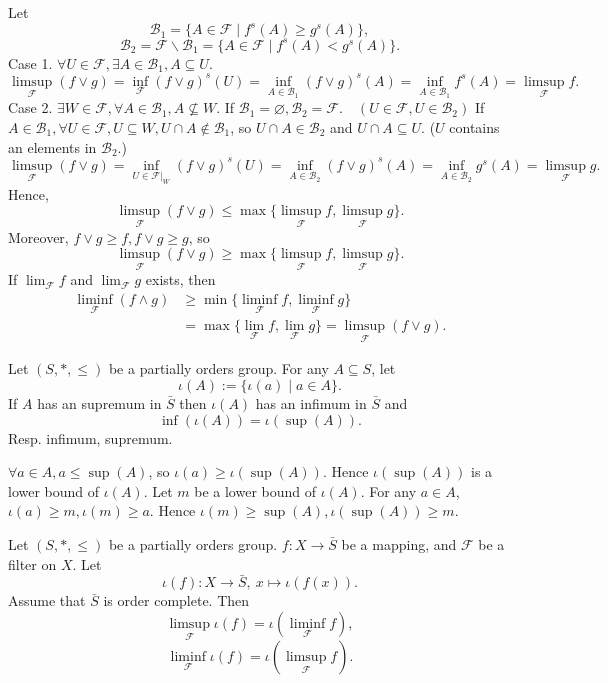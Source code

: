 \begin{proofenv}
    Let $$\mathcal{B}_1=\{A\in \mathcal{F}\mid f^s(A)\ge g^s(A)\},$$
    $$\mathcal{B}_2=\mathcal{F}\backslash\mathcal{B}_1=\{A\in\mathcal{F}\mid f^s(A)<g^s(A)\}.$$
    Case 1. $\forall U\in \mathcal{F},\exists A\in \mathcal{B}_1, A\subseteq U$.
    $$\limsup_\mathcal{F}(f\vee g)=\inf_{\mathcal{F}}(f\vee g)^s(U)=\inf_{A\in \mathcal{B}_1}(f\vee g)^s(A)=\inf _{A\in \mathcal{B}_1}f^s(A)=\limsup_{\mathcal{F}}f.$$
    Case 2. $\exists W\in \mathcal{F}, \forall A\in \mathcal{B}_1,A\nsubseteq  W$. If $\mathcal{B}_1=\varnothing, \mathcal{B}_2=\mathcal{F}.\quad (U\in \mathcal{F},U\in\mathcal{B}_2)$ If $A\in \mathcal{B}_1, \forall U\in \mathcal{F}, U\subseteq W, U\cap A\notin \mathcal{B}_1 $, so $U\cap A\in \mathcal{B}_2$ and $U\cap A\subseteq U$. ($U$ contains an elements in $\mathcal{B}_2$.)
    $$\limsup_{\mathcal{F}}(f\vee g)=\inf _{U\in \mathcal{F}|_W}(f\vee g)^s(U)=\inf_{A\in \mathcal{B}_2}(f\vee g)^s(A)=\inf_{A\in \mathcal{B}_2}g^s(A)=\limsup_{\mathcal{F}}g.$$
    Hence,
    $$\limsup_{\mathcal{F}}(f\vee g)\le \max\{\limsup_{\mathcal{F}}f,\limsup_{\mathcal{F}}g\}.$$
    Moreover, $f\vee g\ge f, f\vee g\ge g$, so
    $$\limsup_{\mathcal{F}}(f\vee g)\ge \max\{\limsup_{\mathcal{F}}f,\limsup_{\mathcal{F}}g\}.$$
    If $\lim_{\mathcal{F}}f$ and $\lim_{\mathcal{F}}g$ exists, then
    \begin{align*}
        \liminf_{\mathcal{F}}(f\wedge g)&\ge \min\{\liminf_{\mathcal{F}}f,\liminf_{\mathcal{F}}g\}\\
        &=\max\{\lim_\mathcal{F} f,\lim_\mathcal{F} g\}=\limsup_{\mathcal{F}}(f\vee g).
    \end{align*}
\end{proofenv}
\begin{propositionenv}
    Let $(S,*,\le)$ be a partially orders group. For any $A\subseteq S$, let 
    $$\iota(A):=\{\iota(a)\mid a\in A\}.$$
    If $A$ has an supremum in $\bar{S}$ then $\iota(A)$ has an infimum in $\bar{S}$ and
    $$\inf(\iota(A))=\iota(\sup(A)).$$
    Resp. infimum, supremum.
\end{propositionenv}
\begin{proofenv}
    \quad \newline
    $\forall a\in A, a\le \sup (A)$, so $\iota(a)\ge \iota(\sup(A))$. Hence $\iota(\sup(A))$ is a lower bound of $\iota(A)$. Let $m$ be a lower bound of $\iota(A)$. For any $a\in A$, $\iota(a)\ge m, \iota(m)\ge a$. Hence $\iota(m)\ge \sup(A),\iota(\sup(A))\ge m$. 
\end{proofenv}
\begin{corollaryenv}
    Let $(S,*,\le)$ be a partially orders group. $f:X\longrightarrow \bar{S}$ be a mapping, and $\mathcal{F}$ be a filter on $X$. Let $$\iota(f):X\longrightarrow \bar{S},\ x\longmapsto \iota(f(x)).$$
    Assume that $\bar{S}$ is order complete. Then 
    $$\limsup_{\mathcal{F}}\iota(f)=\iota(\liminf_{\mathcal{F}}f),$$
    $$\liminf_{\mathcal{F}}\iota(f)=\iota(\limsup_{\mathcal{F}}f).$$
\end{corollaryenv}

